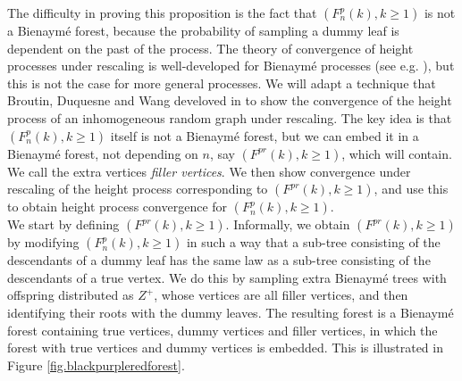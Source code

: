 The difficulty in proving this proposition is the fact that $(F^p_n(k),k\geq 1)$ is not a Bienaymé forest, because the probability of sampling a dummy leaf is dependent on the past of the process. The theory of convergence of height processes under rescaling is well-developed for Bienaymé processes (see e.g. \cite{AST_2002__281__R1_0}), but this is not the case for more general processes.  We will adapt a technique that Broutin, Duquesne and Wang develoved in \cite{broutinLimitsMultiplicativeInhomogeneous2020} to show the convergence of the height process of an inhomogeneous random graph under rescaling. The key idea is that  $(F^p_n(k),k\geq 1)$ itself is not a Bienaymé forest, but we can embed it in a Bienaymé forest, not depending on $n$, say $(F^{pr}(k),k\geq 1)$, which will contain. We call the extra vertices \emph{filler vertices}. We then show convergence under rescaling of the height process corresponding to $(F^{pr}(k),k\geq 1)$, and use this to obtain height process convergence for $(F^p_n(k),k\geq 1)$. \\
We start by defining $(F^{pr}(k),k\geq 1)$. Informally, we obtain $(F^{pr}(k),k\geq 1)$ by modifying $(F^p_n(k),k\geq 1)$ in such a way that a sub-tree consisting of the descendants of a dummy leaf has the same law as a sub-tree consisting of the descendants of a true vertex. We do this by sampling extra Bienaymé trees with offspring distributed as $Z^+$, whose vertices are all filler vertices, and then identifying their roots with the dummy leaves. The resulting forest is a Bienaymé forest containing true vertices, dummy vertices and filler vertices, in which the forest with true vertices and dummy vertices is embedded. This is illustrated in Figure \ref{fig.blackpurpleredforest}. 

